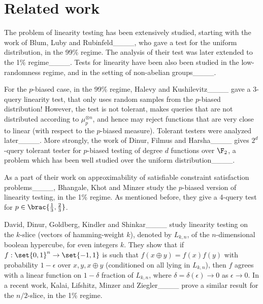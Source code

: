 \section{Related work}
The problem of linearity testing has been extensively studied, starting with the work of Blum, Luby and Rubinfeld____, who gave a test for the uniform distribution, in the 99\% regime.
The analysis of their test was later extended to the 1\% regime____.
Tests for linearity have been also been studied in the low-randomness regime, and in the setting of non-abelian groups____.

For the $p$-biased case, in the 99\% regime, Halevy and Kushilevitz____ gave a 3-query linearity test, that only uses random samples from the $p$-biased distribution!
However, the test is not tolerant, makes queries that are not distributed according to $\mu_p^{\otimes n}$, and hence may reject functions that are very close to linear (with respect to the $p$-biased measure).
Tolerant testers were analyzed later____.
More strongly, the work of Dinur, Filmus and Harsha____ gives $2^d$-query tolerant tester for $p$-biased testing of degree $d$ functions over $\F_2$, a problem which has been well studied over the uniform distribution____.

As a part of their work on approximability of satisfiable constraint satisfaction problems____, Bhangale, Khot and Minzer study the $p$-biased version of linearity testing, in the 1\% regime.
As mentioned before, they give a 4-query test for $p\in \brac{\frac{1}{3},\frac{2}{3}}$. 

David, Dinur, Goldberg, Kindler and Shinkar____ study linearity testing on the $k$-slice (vectors of hamming-weight $k$), denoted by $L_{k,n}$, of the $n$-dimensional boolean hypercube, for even integers $k$. 
They show that if $f:\set{0,1}^n\to \set{-1,1}$ is such that $f(x\oplus y) = f(x)f(y)$ with probability $1-\epsilon$ over $x,y,x\oplus y$ (conditioned on all lying in $L_{k,n}$), then $f$ agrees with a linear function on $1-\delta$ fraction of $L_{k,n}$, where $\delta = \delta(\epsilon)\to 0$ as $\epsilon \to 0$.
In a recent work, Kalai, Lifshitz, Minzer and Ziegler____ prove a similar result for the $n/2$-slice, in the 1\% regime.
